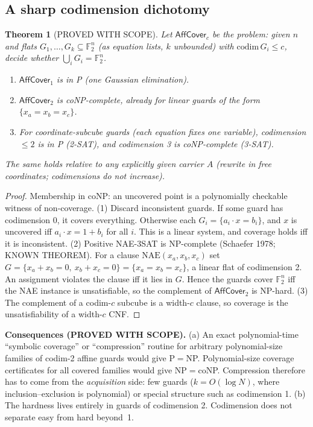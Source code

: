 \documentclass[11pt]{article}
\newtheorem{theorem}{Theorem}
\theoremstyle{definition}
\newcommand{\F}{\mathbb{F}_2}
\begin{document}
\subsection{A sharp codimension dichotomy}
\begin{theorem}[PROVED WITH SCOPE]\label{thm:dich}
Let $\mathsf{AffCover}_c$ be the problem: given $n$ and flats $G_1,\dots,G_k\subseteq\F^n$ (as equation lists, $k$ unbounded) with $\mathrm{codim}\,G_i\le c$, decide whether $\bigcup_iG_i=\F^n$.
\begin{enumerate}
\item $\mathsf{AffCover}_1$ is in P (one Gaussian elimination).
\item $\mathsf{AffCover}_2$ is coNP-complete, already for \emph{linear} guards of the form $\{x_a=x_b=x_c\}$.
\item For coordinate-subcube guards (each equation fixes one variable), codimension $\le 2$ is in P (2-SAT), and codimension 3 is coNP-complete (3-SAT).
\end{enumerate}
The same holds relative to any explicitly given carrier $A$ (rewrite in free coordinates; codimensions do not increase).
\end{theorem}
\begin{proof}
Membership in coNP: an uncovered point is a polynomially checkable witness of non-coverage.
(1) Discard inconsistent guards. If some guard has codimension 0, it covers everything. Otherwise each $G_i=\{a_i\cdot x=b_i\}$, and $x$ is uncovered iff $a_i\cdot x=1+b_i$ for all $i$. This is a linear system, and coverage holds iff it is inconsistent.
(2) Positive NAE-3SAT is NP-complete (Schaefer 1978; KNOWN THEOREM). For a clause $\mathrm{NAE}(x_a,x_b,x_c)$ set $G=\{x_a+x_b=0,\ x_b+x_c=0\}=\{x_a=x_b=x_c\}$, a linear flat of codimension 2. An assignment violates the clause iff it lies in $G$. Hence the guards cover $\F^n$ iff the NAE instance is unsatisfiable, so the complement of $\mathsf{AffCover}_2$ is NP-hard.
(3) The complement of a codim-$c$ subcube is a width-$c$ clause, so coverage is the unsatisfiability of a width-$c$ CNF.
\end{proof}
\noindent\textbf{Consequences (PROVED WITH SCOPE).} (a) An exact polynomial-time ``symbolic coverage'' or ``compression'' routine for arbitrary polynomial-size families of codim-2 affine guards would give P$=$NP. Polynomial-size coverage certificates for all covered families would give NP$=$coNP. Compression therefore has to come from the \emph{acquisition} side: few guards ($k=O(\log N)$, where inclusion--exclusion is polynomial) or special structure such as codimension 1. (b) The hardness lives entirely in guards of codimension 2. Codimension does not separate easy from hard beyond~1.
\end{document}
